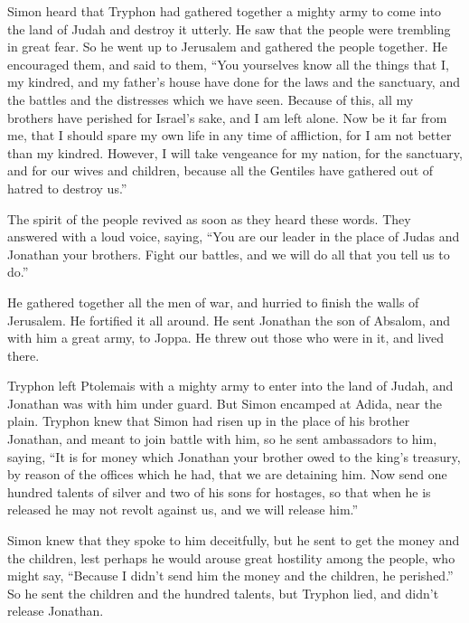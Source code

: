  Simon heard that Tryphon had gathered together a mighty
army to come into the land of Judah and destroy it utterly. 
He saw that the people were trembling in great fear. So he went up to
Jerusalem and gathered the people together.  He encouraged
them, and said to them, ``You yourselves know all the things that I, my
kindred, and my father's house have done for the laws and the sanctuary,
and the battles and the distresses which we have seen. 
Because of this, all my brothers have perished for Israel's sake, and I
am left alone.  Now be it far from me, that I should spare
my own life in any time of affliction, for I am not better than my
kindred.  However, I will take vengeance for my nation, for
the sanctuary, and for our wives and children, because all the Gentiles
have gathered out of hatred to destroy us.''

 The spirit of the people revived as soon as they heard
these words.  They answered with a loud voice, saying, ``You
are our leader in the place of Judas and Jonathan your brothers.
 Fight our battles, and we will do all that you tell us to
do.''

 He gathered together all the men of war, and hurried to
finish the walls of Jerusalem. He fortified it all around. 
He sent Jonathan the son of Absalom, and with him a great army, to
Joppa. He threw out those who were in it, and lived there.

 Tryphon left Ptolemais with a mighty army to enter into
the land of Judah, and Jonathan was with him under guard. 
But Simon encamped at Adida, near the plain.  Tryphon knew
that Simon had risen up in the place of his brother Jonathan, and meant
to join battle with him, so he sent ambassadors to him, saying,
 ``It is for money which Jonathan your brother owed to the
king's treasury, by reason of the offices which he had, that we are
detaining him.  Now send one hundred talents of silver and
two of his sons for hostages, so that when he is released he may not
revolt against us, and we will release him.''

 Simon knew that they spoke to him deceitfully, but he sent
to get the money and the children, lest perhaps he would arouse great
hostility among the people,  who might say, ``Because I
didn't send him the money and the children, he perished.'' 
So he sent the children and the hundred talents, but Tryphon lied, and
didn't release Jonathan.

